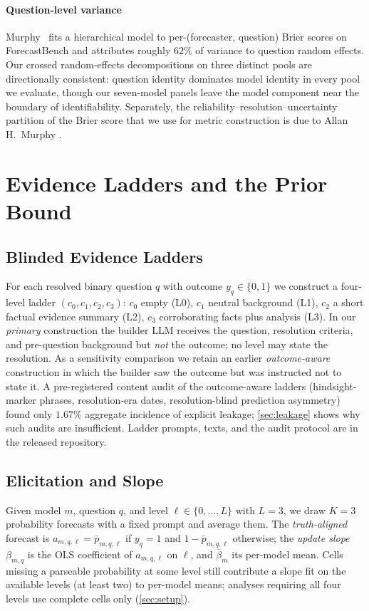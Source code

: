 \documentclass[conference]{IEEEtran}
\theoremstyle{plain}
\theoremstyle{remark}
\begin{document}
\paragraph{Question-level variance}
Murphy~\citep{murphy2026agentic} fits a hierarchical model to per-(forecaster, question) Brier scores on ForecastBench and attributes roughly $62\%$ of variance to question random effects. Our crossed random-effects decompositions on three distinct pools are directionally consistent: question identity dominates model identity in every pool we evaluate, though our seven-model panels leave the model component near the boundary of identifiability. Separately, the reliability--resolution--uncertainty partition of the Brier score that we use for metric construction is due to Allan H.\ Murphy \citep{murphy1973vector}.

\section{Evidence Ladders and the Prior Bound}

\subsection{Blinded Evidence Ladders}

For each resolved binary question $q$ with outcome $y_q \in \{0,1\}$ we construct a four-level ladder $(c_0, c_1, c_2, c_3)$: $c_0$ empty (L0), $c_1$ neutral background (L1), $c_2$ a short factual evidence summary (L2), $c_3$ corroborating facts plus analysis (L3). In our \emph{primary} construction the builder LLM receives the question, resolution criteria, and pre-question background but \emph{not} the outcome; no level may state the resolution. As a sensitivity comparison we retain an earlier \emph{outcome-aware} construction in which the builder saw the outcome but was instructed not to state it. A pre-registered content audit of the outcome-aware ladders (hindsight-marker phrases, resolution-era dates, resolution-blind prediction asymmetry) found only $1.67\%$ aggregate incidence of explicit leakage; \cref{sec:leakage} shows why such audits are insufficient. Ladder prompts, texts, and the audit protocol are in the released repository.

\subsection{Elicitation and Slope}

Given model $m$, question $q$, and level $\ell \in \{0,\dots,L\}$ with $L=3$, we draw $K=3$ probability forecasts with a fixed prompt and average them. The \emph{truth-aligned} forecast is $a_{m,q,\ell} = \bar p_{m,q,\ell}$ if $y_q=1$ and $1-\bar p_{m,q,\ell}$ otherwise; the \emph{update slope} $\beta_{m,q}$ is the OLS coefficient of $a_{m,q,\ell}$ on $\ell$, and $\bar\beta_m$ its per-model mean. Cells missing a parseable probability at some level still contribute a slope fit on the available levels (at least two) to per-model means; analyses requiring all four levels use complete cells only (\cref{sec:setup}).
\end{document}
